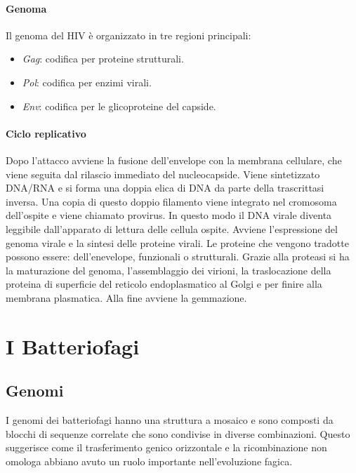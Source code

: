 			\paragraph{Genoma}
			Il genoma del HIV \`e organizzato in tre regioni principali:
			\begin{multicols}{2}
				\begin{itemize}
    					\item \emph{Gag}: codifica per proteine strutturali.
					\item \emph{Pol}: codifica per enzimi virali.
					\item \emph{Env}: codifica per le glicoproteine del capside. 
				\end{itemize}
			\end{multicols}

			\paragraph{Ciclo replicativo}
			Dopo l'attacco avviene la fusione dell'envelope con la membrana cellulare, che viene seguita dal rilascio immediato del nucleocapside. 
			Viene sintetizzato DNA/RNA e si forma una doppia elica di DNA da parte della trascrittasi inversa. 
			Una copia di questo doppio filamento viene integrato nel cromosoma dell'ospite e viene chiamato provirus. 
			In questo modo il DNA virale diventa leggibile dall'apparato di lettura delle cellula ospite. 
			Avviene l'espressione del genoma virale e la sintesi delle proteine virali. 
			Le proteine che vengono tradotte possono essere: dell'enevelope, funzionali o strutturali. 
			Grazie alla proteasi si ha la maturazione del genoma, l'assemblaggio dei virioni, la traslocazione della proteina di superficie del reticolo endoplasmatico al Golgi e per finire alla membrana plasmatica. 
			Alla fine avviene la gemmazione. 

\section{I Batteriofagi}
	
	\subsection{Genomi}
	I genomi dei batteriofagi hanno una struttura a mosaico e sono composti da blocchi di sequenze correlate che sono condivise in diverse combinazioni. 
	Questo suggerisce come il trasferimento genico orizzontale e la ricombinazione non omologa abbiano avuto un ruolo importante nell'evoluzione fagica.
